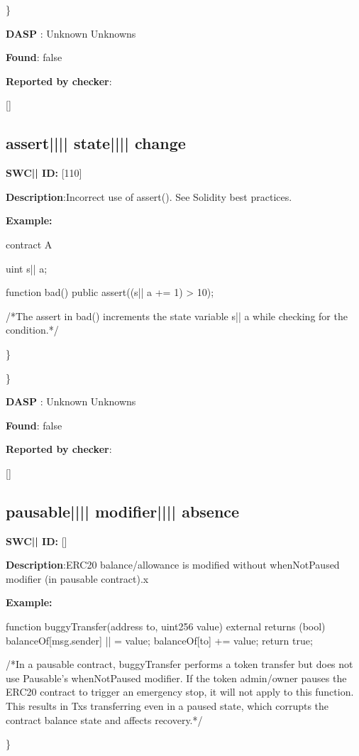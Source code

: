 \documentclass{article}
\begin{document}
\} 

\textbf{DASP} : Unknown Unknowns

\textbf{Found}: false

\textbf{Reported by checker}: 
\begin{ffcode} 

[]
\end{ffcode} 
\subsection{assert{||\textunderscore|| }state{||\textunderscore|| }change} 
\textbf{SWC{|\textunderscore| }ID:} [110]

\textbf{Description}:Incorrect use of assert(). See Solidity best practices.


\textbf{Example:} 
\begin{ffcode} 

contract A {
  uint s|\textunderscore| a;

  function bad() public {
    assert((s|\textunderscore| a += 1) > 10);
  }
}
 /*The assert in bad() increments the state variable s|\textunderscore| a while checking for the condition.*/ 

\end{ffcode} 
\} 

\} 

\textbf{DASP} : Unknown Unknowns

\textbf{Found}: false

\textbf{Reported by checker}: 
\begin{ffcode} 

[]
\end{ffcode} 
\subsection{pausable{||\textunderscore|| }modifier{||\textunderscore|| }absence} 
\textbf{SWC{|\textunderscore| }ID:} []

\textbf{Description}:ERC20 balance/allowance is modified without whenNotPaused modifier (in pausable contract).x


\textbf{Example:} 
\begin{ffcode} 

function buggyTransfer(address to, uint256 value) external returns (bool){
        balanceOf[msg.sender] |\textendash| = value;
        balanceOf[to] += value;
        return true;
    }

 /*In a pausable contract, buggyTransfer performs a token transfer but does not use Pausable's whenNotPaused modifier. If the token admin/owner pauses the ERC20 contract to trigger an emergency stop, it will not apply to this function. This results in Txs transferring even in a paused state, which corrupts the contract balance state and affects recovery.*/ 

\end{ffcode} 
\} 
\end{document}
